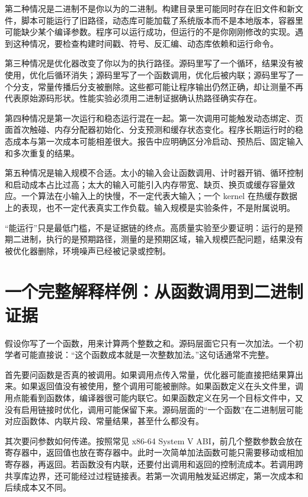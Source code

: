 第二种情况是二进制不是你以为的二进制。构建目录里可能同时存在旧文件和新文件，脚本可能运行了旧路径，动态库可能加载了系统版本而不是本地版本，容器里可能缺少某个编译参数。程序可以运行成功，但运行的不是你刚刚修改的实现。遇到这种情况，要检查构建时间戳、符号、反汇编、动态库依赖和运行命令。

第三种情况是优化器改变了你以为的执行路径。源码里写了一个循环，结果没有被使用，优化后循环消失；源码里写了一个函数调用，优化后被内联；源码里写了一个分支，常量传播后分支被删除。这些都可能让程序输出仍然正确，却让测量不再代表原始源码形状。性能实验必须用二进制证据确认热路径确实存在。

第四种情况是第一次运行和稳态运行混在一起。第一次调用可能触发动态绑定、页面首次触碰、内存分配器初始化、分支预测和缓存状态变化。程序长期运行时的稳态成本与第一次成本可能相差很大。报告中应明确区分冷启动、预热后、固定输入和多次重复的结果。

第五种情况是输入规模不合适。太小的输入会让函数调用、计时器开销、循环控制和启动成本占比过高；太大的输入可能引入内存带宽、缺页、换页或缓存容量效应。一个算法在小输入上的快慢，不一定代表大输入；一个 kernel 在热缓存数据上的表现，也不一定代表真实工作负载。输入规模是实验条件，不是附属说明。

\begin{warningbox}
“能运行”只是最低门槛，不是证据链的终点。高质量实验至少要证明：运行的是预期二进制，执行的是预期路径，测量的是预期区域，输入规模匹配问题，结果没有被优化器删除，环境噪声已经被记录或控制。
\end{warningbox}

\section{一个完整解释样例：从函数调用到二进制证据}

假设你写了一个函数，用来计算两个整数之和。源码层面它只有一次加法。一个初学者可能直接说：“这个函数成本就是一次整数加法。”这句话通常不完整。

首先要问函数是否真的被调用。如果调用点传入常量，优化器可能直接把结果算出来。如果返回值没有被使用，整个调用可能被删除。如果函数定义在头文件里，调用点能看到函数体，编译器很可能内联它。如果函数定义在另一个目标文件中，又没有启用链接时优化，调用可能保留下来。源码层面的“一个函数”在二进制层可能对应函数体、内联片段、常量结果，甚至什么都没有。

其次要问参数如何传递。按照常见 x86-64 System V ABI，前几个整数参数会放在寄存器中，返回值也放在寄存器中。此时一次简单加法函数可能只需要移动或相加寄存器，再返回。若函数没有内联，还要付出调用和返回的控制流成本。若调用跨共享库边界，还可能经过过程链接表。若第一次调用触发延迟绑定，第一次成本和后续成本又不同。

